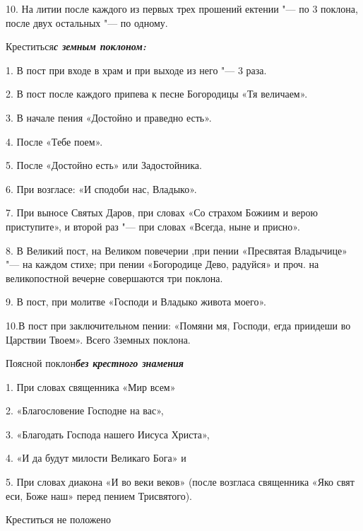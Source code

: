 10. На литии после каждого из первых трех прошений ектении "--- по 3 поклона, после двух остальных "--- по одному.

\bfseries 

Креститься\normalfont{}\bfseries \itshape  с земным поклоно\normalfont{}\normalfont{}\bfseries м: \normalfont{}

1. В пост при входе в храм и при выходе из него "--- 3 раза. 

2. В пост после каждого припева к песне Богородицы «Тя величаем». 

3. В начале пения «Достойно и праведно есть». 

4. После «Тебе поем». 

5. После «Достойно есть» или Задостойника. 

6. При возгласе: «И сподоби нас, Владыко». 

7. При выносе Святых Даров, при словах «Со страхом Божиим и верою приступите», и второй раз "--- при словах «Всегда, ныне и присно». 

8. В Великий пост, на Великом повечерии ,при пении «Пресвятая Владычице» "--- на каждом стихе; при пении «Богородице Дево, радуйся» и проч. на великопостной вечерне совершаются три поклона. 

9. В пост, при молитве «Господи и Владыко живота моего». 

10.В пост при заключительном пении: «Помяни мя, Господи, егда приидеши во Царствии Твоем». Всего 3земных поклона.





\bfseries 

Поясной поклон\normalfont{}\bfseries \itshape  без крестного знамени\normalfont{}\normalfont{}\bfseries я \normalfont{}

1. При словах священника «Мир всем»

2. «Благословение Господне на вас»,





3. «Благодать Господа нашего Иисуса Христа», 

4. «И да будут милости Великаго Бога» и

5. При словах диакона «И во веки веков» (после возгласа священника «Яко свят еси, Боже наш» перед пением Трисвятого). 






\bfseries 


Креститься не положено


